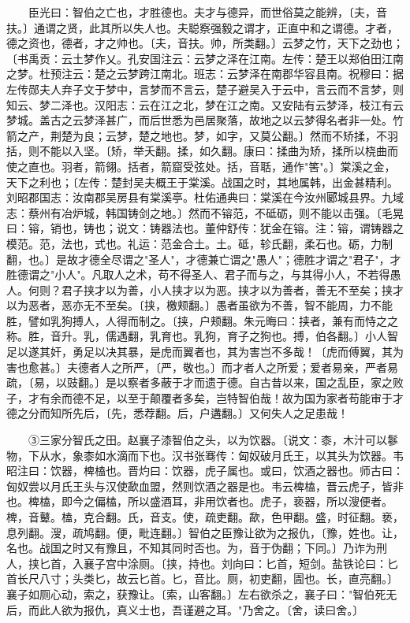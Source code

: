 　　臣光曰：智伯之亡也，才胜德也。夫才与德异，而世俗莫之能辨，〔夫，音扶。〕通谓之贤，此其所以失人也。夫聪察强毅之谓才，正直中和之谓德。才者，德之资也，德者，才之帅也。〔夫，音扶。帅，所类翻。〕云梦之竹，天下之劲也；〔书禹贡：云土梦作乂。孔安国注云：云梦之泽在江南。左传：楚王以郑伯田江南之梦。杜预注云：楚之云梦跨江南北。班志：云梦泽在南郡华容县南。祝穆曰：据左传郧夫人弃子文于梦中，言梦而不言云，楚子避吴入于云中，言云而不言梦，则知云、梦二泽也。汉阳志：云在江之北，梦在江之南。又安陆有云梦泽，枝江有云梦城。盖古之云梦泽甚广，而后世悉为邑居聚落，故地之以云梦得名者非一处。竹箭之产，荆楚为良；云梦，楚之地也。梦，如字，又莫公翻。〕然而不矫揉，不羽括，则不能以入坚。〔矫，举夭翻。揉，如久翻。康曰：揉曲为矫，揉所以桡曲而使之直也。羽者，箭翎。括者，箭窟受弦处。括，音聒，通作"筈"。〕棠溪之金，天下之利也；〔左传：楚封吴夫概王于棠溪。战国之时，其地属韩，出金甚精利。刘昭郡国志：汝南郡吴房县有棠溪亭。杜佑通典曰：棠溪在今汝州郾城县界。九域志：蔡州有冶炉城，韩国铸剑之地。〕然而不镕范，不砥砺，则不能以击强。〔毛晃曰：镕，销也，铸也；说文：铸器法也。董仲舒传：犹金在镕。注：镕，谓铸器之模范。范，法也，式也。礼运：范金合土。土。砥，轸氏翻，柔石也。砺，力制翻，也。〕是故才德全尽谓之"圣人"，才德兼亡谓之"愚人"；德胜才谓之"君子"，才胜德谓之"小人"。凡取人之术，苟不得圣人、君子而与之，与其得小人，不若得愚人。何则？君子挟才以为善，小人挟才以为恶。挟才以为善者，善无不至矣；挟才以为恶者，恶亦无不至矣。〔挟，檄颊翻。〕愚者虽欲为不善，智不能周，力不能胜，譬如乳狗搏人，人得而制之。〔挟，户颊翻。朱元晦曰：挟者，兼有而恃之之称。胜，音升。乳，儒遇翻，乳育也。乳狗，育子之狗也。搏，伯各翻。〕小人智足以遂其奸，勇足以决其暴，是虎而翼者也，其为害岂不多哉！〔虎而傅翼，其为害也愈甚。〕夫德者人之所严，〔严，敬也。〕而才者人之所爱；爱者易亲，严者易疏，〔易，以豉翻。〕是以察者多蔽于才而遗于德。自古昔以来，国之乱臣，家之败子，才有余而德不足，以至于颠覆者多矣，岂特智伯哉！故为国为家者苟能审于才德之分而知所先后，〔先，悉荐翻。后，户遘翻。〕又何失人之足患哉！

　　③三家分智氏之田。赵襄子漆智伯之头，以为饮器。〔说文：桼，木汁可以鬖物，下从水，象桼如水滴而下也。汉书张骞传：匈奴破月氏王，以其头为饮器。韦昭注曰：饮器，椑榼也。晋灼曰：饮器，虎子属也。或曰，饮酒之器也。师古曰：匈奴尝以月氏王头与汉使歃血盟，然则饮酒之器是也。韦云椑榼，晋云虎子，皆非也。椑榼，即今之偏榼，所以盛酒耳，非用饮者也。虎子，亵器，所以溲便者。椑，音鼙。榼，克合翻。氏，音支。使，疏吏翻。歃，色甲翻。盛，时征翻。亵，息列翻。溲，疏鸠翻。便，毗连翻。〕智伯之臣豫让欲为之报仇，〔豫，姓也。让，名也。战国之时又有豫且，不知其同时否也。为，音于伪翻；下同。〕乃诈为刑人，挟匕首，入襄子宫中涂厕。〔挟，持也。刘向曰：匕首，短剑。盐铁论曰：匕首长尺八寸；头类匕，故云匕首。匕，音比。厕，初吏翻，圊也。长，直亮翻。〕襄子如厕心动，索之，获豫让。〔索，山客翻。〕左右欲杀之，襄子曰："智伯死无后，而此人欲为报仇，真义士也，吾谨避之耳。"乃舍之。〔舍，读曰舍。〕

